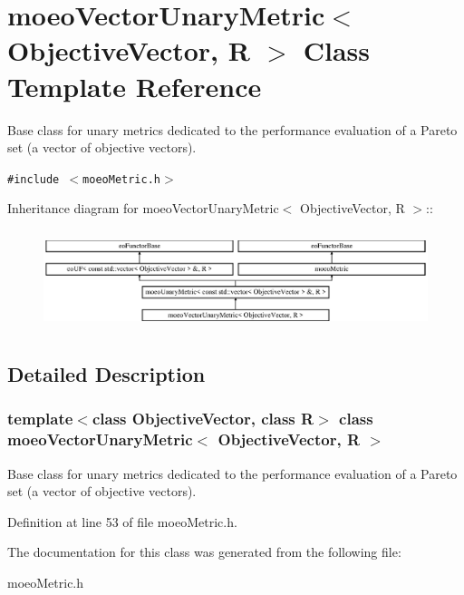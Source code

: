 \section{moeo\-Vector\-Unary\-Metric$<$ Objective\-Vector, R $>$ Class Template Reference}
\label{classmoeoVectorUnaryMetric}
Base class for unary metrics dedicated to the performance evaluation of a Pareto set (a vector of objective vectors).  


{\tt \#include $<$moeo\-Metric.h$>$}

Inheritance diagram for moeo\-Vector\-Unary\-Metric$<$ Objective\-Vector, R $>$::\begin{figure}[H]
\begin{center}
\leavevmode
\includegraphics[height=2.91667cm]{classmoeoVectorUnaryMetric}
\end{center}
\end{figure}


\subsection{Detailed Description}
\subsubsection*{template$<$class Objective\-Vector, class R$>$ class moeo\-Vector\-Unary\-Metric$<$ Objective\-Vector, R $>$}

Base class for unary metrics dedicated to the performance evaluation of a Pareto set (a vector of objective vectors). 



Definition at line 53 of file moeo\-Metric.h.

The documentation for this class was generated from the following file:\begin{CompactItemize}
\item 
moeo\-Metric.h\end{CompactItemize}
